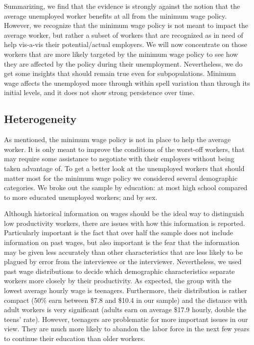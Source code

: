 \documentclass{article}
\begin{document}
Summarizing, we find that the evidence is strongly against the notion that the average unemployed worker benefits at all from the minimum wage policy. However, we recognize that the minimum wage policy is not meant to impact the average worker, but rather a subset of workers that are recognized as in need of help vis-a-vis their potential/actual employers. We will now concentrate on those workers that are more likely targeted by the minimum wage policy to see how they are affected by the policy during their unemployment. Nevertheless, we do get some insights that should remain true even for subpopulations. Minimum wage affects the unemployed more through within spell variation than through its initial levels, and it does not show strong persistence over time.

\subsection{Heterogeneity}

As mentioned, the minimum wage policy is not in place to help the average worker. It is only meant to improve the conditions of the worst-off workers, that may require some assistance to negotiate with their employers without being taken advantage of. To get a better look at the unemployed workers that should matter most for the minimum wage policy we considered several demographic categories. We broke out the sample by education: at most high school compared to more educated unemployed workers; and by sex.

Although historical information on wages should be the ideal way to distinguish low productivity workers, there are issues with how this information is reported. Particularly important is the fact that over half the sample does not include information on past wages, but also important is the fear that the information may be given less accurately than other characteristics that are less likely to be plagued by error from the interviewee or the interviewer. Nevertheless, we used past wage distributions to decide which demographic characteristics separate workers more closely by their productivity. As expected, the group with the lowest average hourly wage is teenagers. Furthermore, their distribution is rather compact (50\% earn between \$7.8 and \$10.4 in our sample) and the distance with adult workers is very significant (adults earn on average \$17.9 hourly, double the teens' rate). However, teenagers are problematic for more important issues in our view. They are much more likely to abandon the labor force in the next few years to continue their education than older workers.
\end{document}

